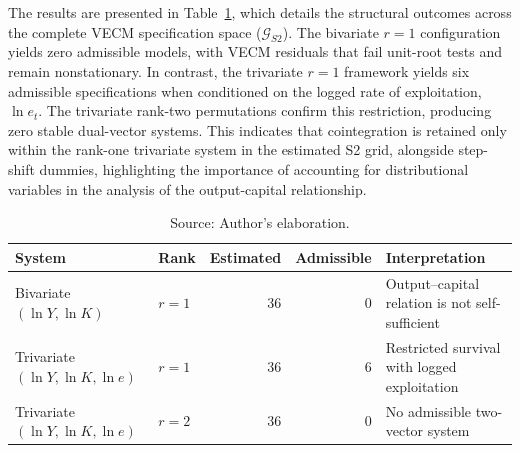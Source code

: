 \documentclass[11pt]{article}
\begin{document}
The results are presented in Table~\ref{tab:s2_admissibility_outcomes}, which details the structural outcomes across the complete VECM specification space ($\mathcal{G}_{S2}$). The bivariate $r=1$ configuration yields zero admissible models, with VECM residuals that fail unit-root tests and remain nonstationary. In contrast, the trivariate $r=1$ framework yields six admissible specifications when conditioned on the logged rate of exploitation, $\ln e_t$. The trivariate rank-two permutations confirm this restriction, producing zero stable dual-vector systems. This indicates that cointegration is retained only within the rank-one trivariate system in the estimated S2 grid, alongside step-shift dummies, highlighting the importance of accounting for distributional variables in the analysis of the output-capital relationship.

\begin{table}[H]
\centering
\caption{S2 System Admissibility Outcomes}
\label{tab:s2_admissibility_outcomes}
\small
\begin{tabular}{llrrp{5.0cm}}
\toprule
System & Rank & Estimated & Admissible & Interpretation \\
\midrule
\midrule
Bivariate $(\ln Y,\ln K)$ & $r=1$ & 36 & 0 & Output--capital relation is not self-sufficient \\
Trivariate $(\ln Y,\ln K,\ln e)$ & $r=1$ & 36 & 6 & Restricted survival with logged exploitation \\
Trivariate $(\ln Y,\ln K,\ln e)$ & $r=2$ & 36 & 0 & No admissible two-vector system \\
\bottomrule
\end{tabular}
\caption*{Source: Author's elaboration.}
\end{table}
\end{document}

